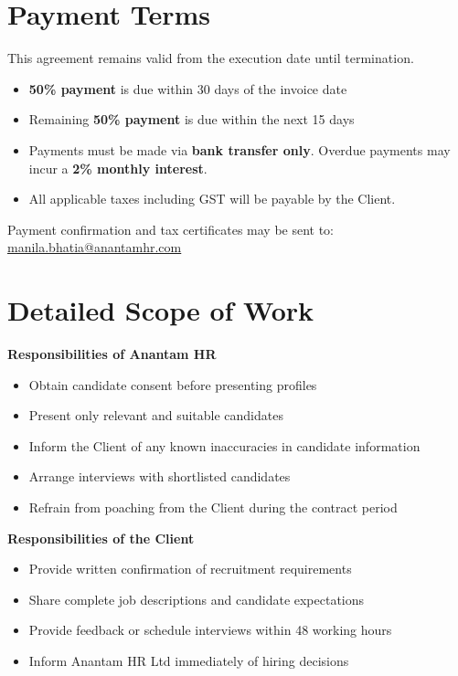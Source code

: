 \documentclass[12pt]{article}
\begin{document}
\section{Payment Terms}

This agreement remains valid from the execution date until termination.

\begin{itemize}
\item \textbf{50\% payment} is due within 30 days of the invoice date
\item Remaining \textbf{50\% payment} is due within the next 15 days
\item Payments must be made via \textbf{bank transfer only}. Overdue payments may incur a \textbf{2\% monthly interest}.
\item All applicable taxes including GST will be payable by the Client.
\end{itemize}

Payment confirmation and tax certificates may be sent to: \href{mailto:manila.bhatia@anantamhr.com}{manila.bhatia@anantamhr.com}

\section{Detailed Scope of Work}

\textbf{Responsibilities of Anantam HR}

\begin{itemize}
\item Obtain candidate consent before presenting profiles
\item Present only relevant and suitable candidates
\item Inform the Client of any known inaccuracies in candidate information
\item Arrange interviews with shortlisted candidates
\item Refrain from poaching from the Client during the contract period
\end{itemize}

\textbf{Responsibilities of the Client}

\begin{itemize}
\item Provide written confirmation of recruitment requirements
\item Share complete job descriptions and candidate expectations
\item Provide feedback or schedule interviews within 48 working hours
\item Inform Anantam HR Ltd immediately of hiring decisions
\end{itemize}
\end{document}

